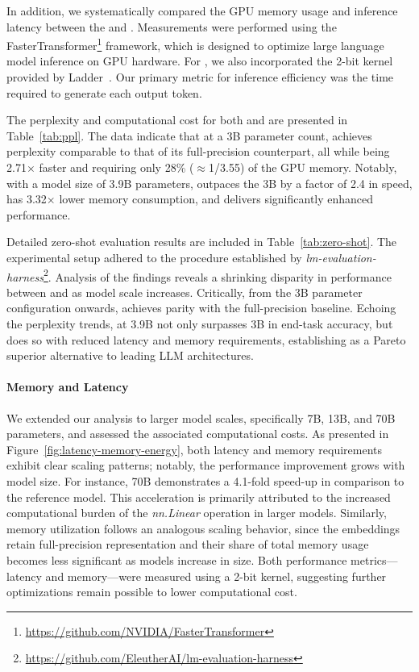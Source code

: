 In addition, we systematically compared the GPU memory usage and inference latency between the  and . Measurements were performed using the FasterTransformer\footnote{\url{https://github.com/NVIDIA/FasterTransformer}} framework, which is designed to optimize large language model inference on GPU hardware. For , we also incorporated the 2-bit kernel provided by Ladder~\cite{ladder}. Our primary metric for inference efficiency was the time required to generate each output token.

The perplexity and computational cost for both  and  are presented in Table~\ref{tab:ppl}. The data indicate that at a 3B parameter count,  achieves perplexity comparable to that of its full-precision  counterpart, all while being 2.71$\times$ faster and requiring only 28\% ($\approx$1/3.55) of the GPU memory. Notably, with a model size of 3.9B parameters,  outpaces the 3B  by a factor of 2.4 in speed, has 3.32$\times$ lower memory consumption, and delivers significantly enhanced performance.

Detailed zero-shot evaluation results are included in Table~\ref{tab:zero-shot}. The experimental setup adhered to the procedure established by \emph{lm-evaluation-harness}\footnote{\url{https://github.com/EleutherAI/lm-evaluation-harness}}. Analysis of the findings reveals a shrinking disparity in performance between  and  as model scale increases. Critically, from the 3B parameter configuration onwards,  achieves parity with the full-precision baseline. Echoing the perplexity trends,  at 3.9B not only surpasses  3B in end-task accuracy, but does so with reduced latency and memory requirements, establishing  as a Pareto superior alternative to leading LLM architectures.

\paragraph{Memory and Latency}

We extended our analysis to larger model scales, specifically 7B, 13B, and 70B parameters, and assessed the associated computational costs. As presented in Figure~\ref{fig:latency-memory-energy}, both latency and memory requirements exhibit clear scaling patterns; notably, the performance improvement grows with model size. For instance,  70B demonstrates a 4.1-fold speed-up in comparison to the  reference model. This acceleration is primarily attributed to the increased computational burden of the \emph{nn.Linear} operation in larger models. Similarly, memory utilization follows an analogous scaling behavior, since the embeddings retain full-precision representation and their share of total memory usage becomes less significant as models increase in size. Both performance metrics—latency and memory—were measured using a 2-bit kernel, suggesting further optimizations remain possible to lower computational cost.

